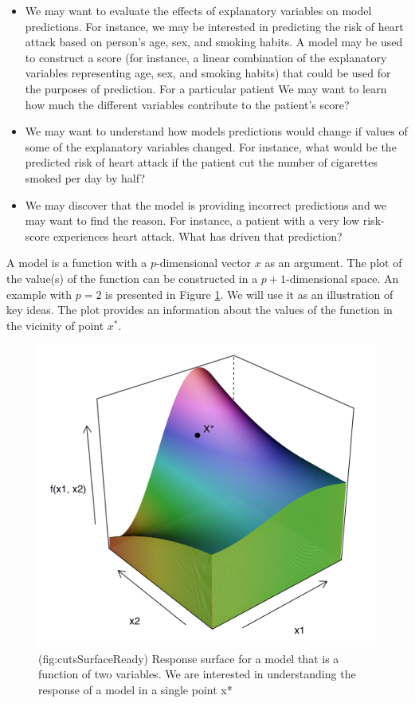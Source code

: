 \documentclass[12pt,]{krantz}
\providecommand{\tightlist}{%
  \setlength{\itemsep}{0pt}\setlength{\parskip}{0pt}}
\theoremstyle{definition}
\theoremstyle{definition}
\theoremstyle{definition}
\theoremstyle{remark}
\begin{document}
\begin{itemize}
\tightlist
\item
  We may want to evaluate the effects of explanatory variables on model
  predictions. For instance, we may be interested in predicting the risk
  of heart attack based on person's age, sex, and smoking habits. A
  model may be used to construct a score (for instance, a linear
  combination of the explanatory variables representing age, sex, and
  smoking habits) that could be used for the purposes of prediction. For
  a particular patient We may want to learn how much the different
  variables contribute to the patient's score?
\item
  We may want to understand how models predictions would change if
  values of some of the explanatory variables changed. For instance,
  what would be the predicted risk of heart attack if the patient cut
  the number of cigarettes smoked per day by half?
\item
  We may discover that the model is providing incorrect predictions and
  we may want to find the reason. For instance, a patient with a very
  low risk-score experiences heart attack. What has driven that
  prediction?
\end{itemize}

A model is a function with a \(p\)-dimensional vector \(x\) as an
argument. The plot of the value(s) of the function can be constructed in
a \(p+1\)-dimensional space. An example with \(p=2\) is presented in
Figure \ref{fig:cutsSurfaceReady}. We will use it as an illustration of
key ideas. The plot provides an information about the values of the
function in the vicinity of point \(x^*\).

\begin{figure}

{\centering \includegraphics[width=0.6\linewidth]{figure/cuts_surface_ready_punkt} 

}

\caption{(fig:cutsSurfaceReady) Response surface for a model that is a function of two variables. We are interested in understanding the response of a model in a single point x*}\label{fig:cutsSurfaceReady}
\end{figure}
\end{document}
